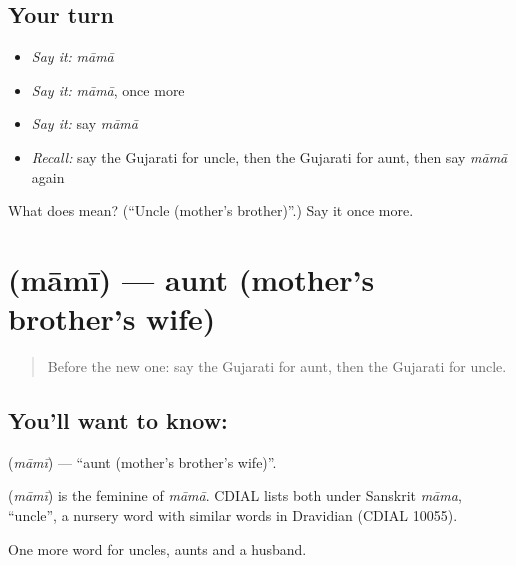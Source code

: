 \subsection*{Your turn}
\begin{itemize}
\raggedright
  \item \emph{Say it:} \emph{māmā}
  \item \emph{Say it:} \emph{māmā}, once more
  \item \emph{Say it:} say \emph{māmā}
  \item \emph{Recall:} say the Gujarati for uncle, then the Gujarati for aunt, then say \emph{māmā} again
\end{itemize}

\begin{tcolorbox}[breakable,colback=teal!4,colframe=teal!35!black,title={Before you move on}]
What does  mean? (\textquotedblleft{}Uncle (mother's brother)\textquotedblright{}.) Say it once more.
\end{tcolorbox}
\section[\texorpdfstring{\gu{મામી} (māmī)}{મામી (māmī)}]{ (māmī) — aunt (mother's brother's wife)}

\label{lesson:GU-C52-mami}



\begin{quote}
Before the new one: say the Gujarati for aunt, then the Gujarati for uncle.
\end{quote}

\subsection*{You'll want to know: }
\textbf{} (\emph{māmī}) — \textquotedblleft{}aunt (mother's brother's wife)\textquotedblright{}.

\begin{cousinweb}
\textbf{} (\emph{māmī}) is the feminine of \emph{māmā}. CDIAL lists both under Sanskrit \emph{māma}, \textquotedblleft{}uncle\textquotedblright{}, a nursery word with similar words in Dravidian (CDIAL 10055).
\end{cousinweb}

\begin{grammarlens}[title={What you've built}]
One more word for uncles, aunts and a husband.
\end{grammarlens}

